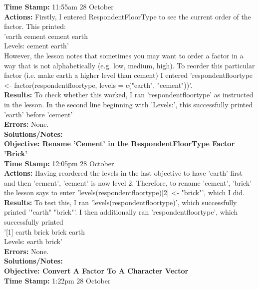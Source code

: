 \documentclass{article}
\begin{document}
\begin{FlushLeft}
\textbf{Time Stamp:} 11:55am 28 October\\
\textbf{Actions:} Firstly, I entered Respondent\textunderscore Floor\textunderscore Type to see the current order of the factor. This printed:\\
'earth  cement cement earth\\ 
Levels: cement earth'\\
However, the lesson notes that sometimes you may want to order a factor in a way that is not alphabetically (e.g. low, medium, high). To reorder this particular factor (i.e. make earth a higher level than cement) I entered 'respondent\textunderscore floor\textunderscore type \textless - factor(respondent\textunderscore floor\textunderscore type, levels = c("earth", "cement"))'.\\
\textbf{Results:} To check whether this worked, I ran 'respondent\textunderscore floor\textunderscore type' as instructed in the lesson. In the second line beginning with 'Levels:', this successfully printed 'earth' before 'cement'\\
\textbf{Errors:} None.\\
\textbf{Solutions/Notes:}\\
\vspace{5mm}
\textbf{Objective: Rename 'Cement' in the Respondent\textunderscore Floor\textunderscore Type Factor 'Brick'}\\ 
\textbf{Time Stamp:} 12:05pm 28 October\\
\textbf{Actions:} Having reordered the levels in the last objective to have 'earth' first and then 'cement', 'cement' is now level 2. Therefore, to rename 'cement', 'brick' the lesson says to enter 'levels(respondent\textunderscore floor\textunderscore type)[2] \textless - "brick"', which I did. \\
\textbf{Results:} To test this, I ran 'levels(respondent\textunderscore floor\textunderscore type)', which successfully printed '"earth" "brick"'. I then additionally ran 'respondent\textunderscore floor\textunderscore type', which successfully printed\\
'[1] earth brick brick earth\\
Levels: earth brick'\\
\textbf{Errors:} None.\\
\textbf{Solutions/Notes:}\\
\vspace{5mm}
\textbf{Objective: Convert A Factor To A Character Vector}\\ 
\textbf{Time Stamp:} 1:22pm 28 October\\

\end{FlushLeft}
\end{document}
